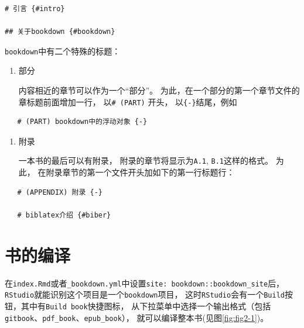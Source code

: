 \documentclass[12pt,]{krantz}
\theoremstyle{plain}
\theoremstyle{nonumberplain}
\begin{document}
\begin{verbatim}
# 引言 {#intro}

## 关于bookdown {#bookdown}
\end{verbatim}

\texttt{bookdown}中有二个特殊的标题：

\begin{enumerate}
\def\labelenumi{\arabic{enumi}.}
\item
  部分

  内容相近的章节可以作为一个``部分''。 为此，在一个部分的第一个章节文件的章标题前面增加一行， 以\texttt{\#\ (PART)} 开头， 以\texttt{\{-\}}结尾，例如
\end{enumerate}

\begin{verbatim}
   # (PART) bookdown中的浮动对象 {-}
\end{verbatim}

\begin{enumerate}
\def\labelenumi{\arabic{enumi}.}
\setcounter{enumi}{1}
\item
  附录

  一本书的最后可以有附录， 附录的章节将显示为\texttt{A.1}, \texttt{B.1}这样的格式。 为此， 在附录章节的第一个文件开头加如下的第一行标题行：
\end{enumerate}

\begin{verbatim}
   # (APPENDIX) 附录 {-}

   # biblatex介绍 {#biber}
\end{verbatim}

\hypertarget{sec2-5}{%
\section{书的编译}\label{sec2-5}}



\indent

在\texttt{index.Rmd}或者\texttt{\_bookdown.yml}中设置\texttt{site:\ bookdown::bookdown\_site}后， \texttt{RStudio}就能识别这个项目是一个\texttt{bookdown}项目， 这时\texttt{RStudio}会有一个\texttt{Build}按钮，其中有\texttt{Build\ book}快捷图标， 从下拉菜单中选择一个输出格式（包括\texttt{gitbook}、\texttt{pdf\_book}、\texttt{epub\_book}）， 就可以编译整本书(见图\ref{fig:fig2-1})。
\end{document}
